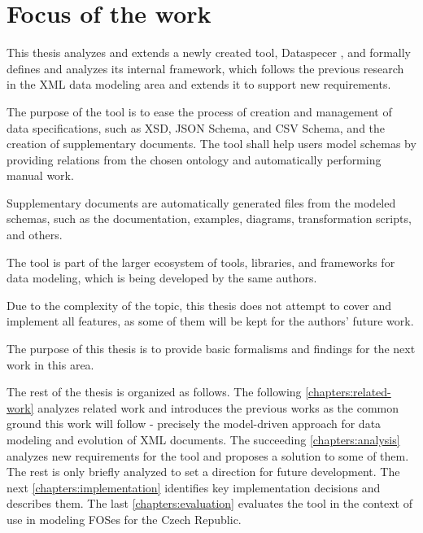\section*{Focus of the work}

This thesis analyzes and extends a newly created tool, Dataspecer \cite{dataspecer}, and formally defines and analyzes its internal framework, which follows the previous research \cite{necasky2007xsem, necasky2012conceptual} in the XML data modeling area and extends it to support new requirements.

The purpose of the tool is to ease the process of creation and management of data specifications, such as XSD, JSON Schema, and CSV Schema, and the creation of supplementary documents. The tool shall help users model schemas by providing relations from the chosen ontology and automatically performing manual work.

Supplementary documents are automatically generated files from the modeled schemas, such as the documentation, examples, diagrams, transformation scripts, and others.

\medskip

The tool is part of the larger ecosystem of tools, libraries, and frameworks for data modeling, which is being developed by the same authors.

Due to the complexity of the topic, this thesis does not attempt to cover and implement all features, as some of them will be kept for the authors' future work.

The purpose of this thesis is to provide basic formalisms and findings for the next work in this area.

\bigskip

The rest of the thesis is organized as follows. The following \autoref{chapters:related-work} analyzes related work and introduces the previous works as the common ground this work will follow - precisely the model-driven approach for data modeling and evolution of XML documents. The succeeding \autoref{chapters:analysis} analyzes new requirements for the tool and proposes a solution to some of them. The rest is only briefly analyzed to set a direction for future development. The next \autoref{chapters:implementation} identifies key implementation decisions and describes them. The last \autoref{chapters:evaluation} evaluates the tool in the context of use in modeling FOSes for the Czech Republic.

